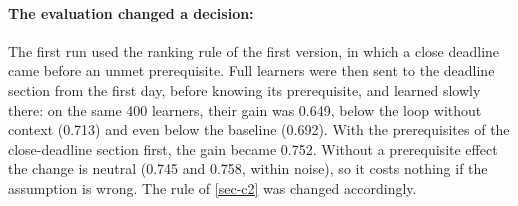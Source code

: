 \paragraph{The evaluation changed a decision:} The first run used the
ranking rule of the first version, in which a close deadline came before
an unmet prerequisite. Full learners were then sent to the deadline
section from the first day, before knowing its prerequisite, and learned
slowly there: on the same 400 learners, their gain was 0.649, below the
loop without context (0.713) and even below the baseline (0.692). With
the prerequisites of the close-deadline section first, the gain became
0.752. Without a prerequisite effect the change is neutral (0.745 and
0.758, within noise), so it costs nothing if the assumption is wrong. The
rule of \cref{sec-c2} was changed accordingly.

